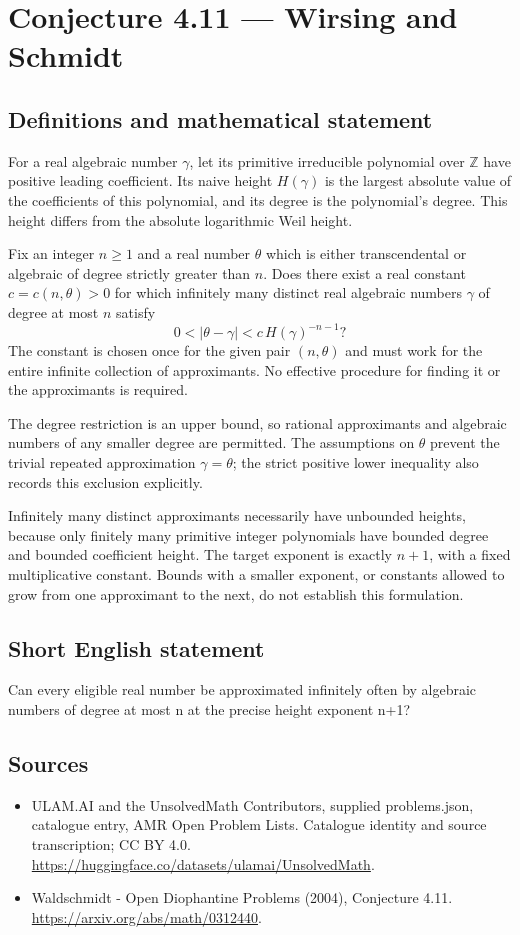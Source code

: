 \documentclass[11pt,a4paper]{article}
\begin{document}
\section*{Conjecture 4.11 — Wirsing and Schmidt}\label{statement}

\subsection{Definitions and mathematical statement}
For a real algebraic number $\gamma$, let its primitive irreducible polynomial over $\mathbb Z$ have positive leading coefficient. Its naive height $H(\gamma)$ is the largest absolute value of the coefficients of this polynomial, and its degree is the polynomial's degree. This height differs from the absolute logarithmic Weil height.

Fix an integer $n\ge1$ and a real number $\theta$ which is either transcendental or algebraic of degree strictly greater than $n$. Does there exist a real constant $c=c(n,\theta)>0$ for which infinitely many distinct real algebraic numbers $\gamma$ of degree at most $n$ satisfy
\[
0<|\theta-\gamma|<c\,H(\gamma)^{-n-1}?
\]
The constant is chosen once for the given pair $(n,\theta)$ and must work for the entire infinite collection of approximants. No effective procedure for finding it or the approximants is required.

The degree restriction is an upper bound, so rational approximants and algebraic numbers of any smaller degree are permitted. The assumptions on $\theta$ prevent the trivial repeated approximation $\gamma=\theta$; the strict positive lower inequality also records this exclusion explicitly.

Infinitely many distinct approximants necessarily have unbounded heights, because only finitely many primitive integer polynomials have bounded degree and bounded coefficient height. The target exponent is exactly $n+1$, with a fixed multiplicative constant. Bounds with a smaller exponent, or constants allowed to grow from one approximant to the next, do not establish this formulation.
\subsection{Short English statement}
Can every eligible real number be approximated infinitely often by algebraic numbers of degree at most n at the precise height exponent n+1?
\subsection{Sources}
\begin{itemize}
\item[S1] ULAM.AI and the UnsolvedMath Contributors, supplied problems.json, catalogue entry, AMR Open Problem Lists. Catalogue identity and source transcription; CC BY 4.0.
\url{https://huggingface.co/datasets/ulamai/UnsolvedMath}.
\item[S2] Waldschmidt - Open Diophantine Problems (2004), Conjecture 4.11. 
\url{https://arxiv.org/abs/math/0312440}.
\end{itemize}
\end{document}
